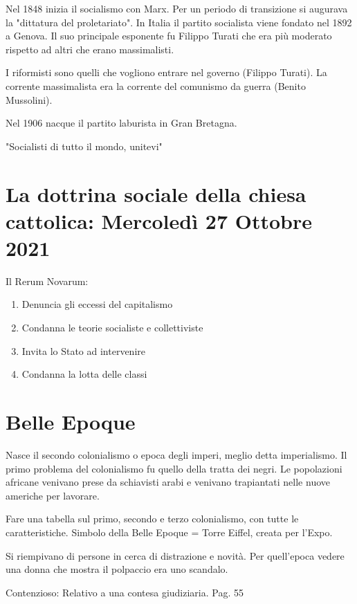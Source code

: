 \documentclass{article}
\begin{document}
    Nel 1848 inizia il socialismo con Marx.
    Per un periodo di transizione si augurava la "dittatura del proletariato".
    In Italia il partito socialista viene fondato nel 1892 a Genova. Il suo principale esponente fu Filippo Turati che era più moderato rispetto ad altri che erano massimalisti.

    I riformisti sono quelli che vogliono entrare nel governo (Filippo Turati).
    La corrente massimalista era la corrente del comunismo da guerra (Benito Mussolini).

    Nel 1906 nacque il partito laburista in Gran Bretagna.

    "Socialisti di tutto il mondo, unitevi"

    \section{La dottrina sociale della chiesa cattolica: Mercoledì 27 Ottobre 2021}
    Il Rerum Novarum:

    \begin{enumerate}
        \item Denuncia gli eccessi del capitalismo
        \item Condanna le teorie socialiste e collettiviste
        \item Invita lo Stato ad intervenire
        \item Condanna la lotta delle classi
    \end{enumerate}

    \section{Belle Epoque}
    Nasce il secondo colonialismo o epoca degli imperi, meglio detta imperialismo.
    Il primo problema del colonialismo fu quello della tratta dei negri. Le popolazioni africane venivano prese da schiavisti arabi e venivano trapiantati nelle nuove americhe per lavorare.

    Fare una tabella sul primo, secondo e terzo colonialismo, con tutte le caratteristiche.
    Simbolo della Belle Epoque = Torre Eiffel, creata per l'Expo.

    Si riempivano di persone in cerca di distrazione e novità. Per quell'epoca vedere una donna che mostra il polpaccio era uno scandalo.

    Contenzioso: Relativo a una contesa giudiziaria.
    Pag. 55
\end{document}
